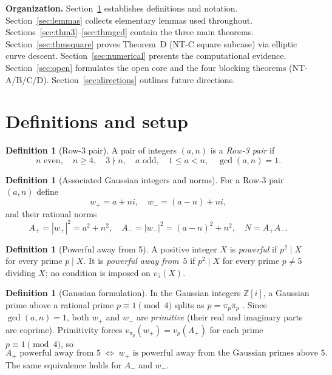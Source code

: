 \documentclass[12pt]{amsart}
\theoremstyle{plain}
\theoremstyle{definition}
\newtheorem{definition}[theorem]{Definition}
\theoremstyle{remark}
\newcommand{\Zi}{\mathbb{Z}[i]}
\newcommand{\Aplus}{A_{+}}
\newcommand{\Aminus}{A_{-}}
\begin{document}
\medskip
\noindent\textbf{Organization.}
Section~\ref{sec:setup} establishes definitions and notation.
Section~\ref{sec:lemmas} collects elementary lemmas used throughout.
Sections~\ref{sec:thm3}--\ref{sec:thmgcd} contain the three main theorems.
Section~\ref{sec:thmsquare} proves Theorem~D (NT-C square subcase) via elliptic
curve descent.
Section~\ref{sec:numerical} presents the computational evidence.
Section~\ref{sec:open} formulates the open core and the four blocking
theorems (NT-A/B/C/D).
Section~\ref{sec:directions} outlines future directions.

\section{Definitions and setup}
\label{sec:setup}

\begin{definition}[Row-3 pair]
\label{def:row3}%
A pair of integers $(a,n)$ is a \emph{Row-3 pair} if
\begin{equation}
  \label{eq:row3}%
  n \text{ even},\quad n\geq 4,\quad 3\nmid n,\quad
  a \text{ odd},\quad 1\leq a < n,\quad \gcd(a,n)=1.
\end{equation}
\end{definition}

\begin{definition}[Associated Gaussian integers and norms]
\label{def:norms}%
For a Row-3 pair $(a,n)$ define
\[
  w_{+} = a+ni,\quad w_{-}=(a-n)+ni,
\]
and their rational norms
\[
  \Aplus = |w_{+}|^2 = a^2+n^2,\quad
  \Aminus = |w_{-}|^2 = (a-n)^2+n^2,\quad
  N = \Aplus\Aminus.
\]
\end{definition}

\begin{definition}[Powerful away from 5]
\label{def:powerful}%
A positive integer $X$ is \emph{powerful} if $p^2\mid X$ for every prime
$p\mid X$.  It is \emph{powerful away from~$5$} if $p^2\mid X$ for every
prime $p\neq 5$ dividing $X$; no condition is imposed on $v_5(X)$.
\end{definition}

\begin{definition}[Gaussian formulation]
\label{def:gaussian}%
In the Gaussian integers $\Zi$, a Gaussian prime above a rational prime
$p\equiv 1\pmod{4}$ splits as $p=\pi_p\bar\pi_p$ \cite{Ireland1990}.  Since $\gcd(a,n)=1$,
both $w_{+}$ and $w_{-}$ are \emph{primitive} (their real and imaginary
parts are coprime).  Primitivity forces $v_{\pi_p}(w_{+}) = v_p(\Aplus)$
for each prime $p\equiv 1\pmod{4}$, so
\[
  \Aplus\text{ powerful away from }5
  \;\iff\;
  w_{+}\text{ is powerful away from the Gaussian primes above }5.
\]
The same equivalence holds for $\Aminus$ and $w_{-}$.
\end{definition}
\end{document}
